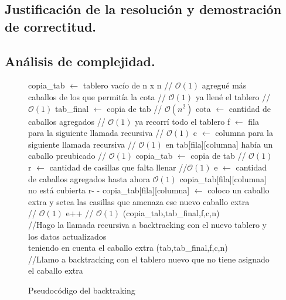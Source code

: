 \vspace*{0.6cm}

\subsection{Justificación de la resolución y demostración de correctitud.}

\vspace*{0.3cm}


\vspace*{0.6cm}

\subsection{Análisis de complejidad.}

\vspace*{0.3cm}


\begin{figure}
\begin{codebox}
\li copia_tab $\leftarrow$ tablero vacío de n x n // $\mathcal{O}(1)$
\li \If agregué más caballos de los que permitía la cota   // $\mathcal{O}(1)$
\li \quad \Return   
\li \If ya llené el tablero                                // $\mathcal{O}(1)$
\li \quad tab_final $\leftarrow$ copia de tab              // $\mathcal{O}(n^2)$
\li \quad cota $\leftarrow$ cantidad de caballos agregados        // $\mathcal{O}(1)$
\li \quad \Return
\li \If ya recorrí todo el tablero
\li \quad \Return
\li f $\leftarrow$ fila para la siguiente llamada recursiva  // $\mathcal{O}(1)$
\li c $\leftarrow$ columna para la siguiente llamada recursiva  // $\mathcal{O}(1)$
\li \If en tab[fila][columna] había un caballo preubicado      // $\mathcal{O}(1)$
\li \quad copia_tab $\leftarrow$ copia de tab              // $\mathcal{O}(1)$
\li \quad r $\leftarrow$ cantidad de casillas que falta llenar  //$\mathcal{O}(1)$
\li \quad e $\leftarrow$ cantidad de caballos agregados hasta ahora $\mathcal{O}(1)$
\li \quad \If copia_tab[fila][columna] no está cubierta
\li \quad \quad r- -
\li \quad copia_tab[fila][columna] $\leftarrow$ coloco un caballo extra y setea las casillas que amenaza ese nuevo caballo extra    \\   // $\mathcal{O}(1)$
\li \quad e++          // $\mathcal{O}(1)$
\li {}(copia_tab,tab_final,f,c,n) \\
//Hago la llamada recursiva a backtracking con el nuevo tablero y los datos actualizados \\
teniendo en cuenta el caballo extra
(tab,tab_final,f,c,n)\\
//Llamo a backtracking con el tablero nuevo que no tiene asignado el caballo extra
\end{codebox}
\caption{Pseudocódigo del backtraking}\label{code:backtraking}
\end{figure}
\FloatBarrier

